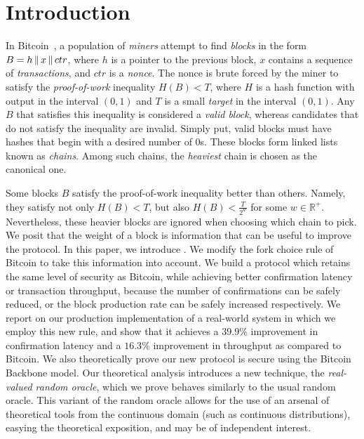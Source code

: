 \section{Introduction}

In Bitcoin~\cite{bitcoin}, a population of \emph{miners}
attempt to find \emph{blocks} in the form $B = h \,\|\, x \,\|\, ctr$,
where $h$ is a pointer to the previous block, $x$ contains a sequence of
\emph{transactions}, and $ctr$ is a \emph{nonce}. The nonce is brute forced
by the miner to satisfy the \emph{proof-of-work} inequality $H(B) < T$, where
$H$ is a hash function with output in the interval $(0, 1)$
and $T$ is a small \emph{target} in the interval $(0, 1)$. Any $B$ that satisfies this
inequality is considered a \emph{valid block}, whereas candidates that do not satisfy
the inequality are invalid. Simply put, valid blocks must have
hashes that begin with a desired number of $0$s.
These blocks form linked lists known as \emph{chains}.
Among such chains, the \emph{heaviest} chain is chosen as the canonical one.

Some blocks $B$ satisfy the proof-of-work inequality better than others.
Namely, they satisfy not only $H(B) < T$, but also $H(B) < \frac{T}{2^w}$
for some $w \in \mathbb{R}^+$. Nevertheless, these heavier blocks are ignored when choosing
which chain to pick.
We posit that the weight of a block is information
that can be useful to improve the protocol.
In this paper, we introduce \emph{\poem}.
We modify the fork choice rule of Bitcoin to take this information into account.
We build a protocol which retains the same level of security as Bitcoin, while achieving
better confirmation latency or transaction throughput, because the number of confirmations
can be safely reduced, or the block production rate can be safely increased respectively.
We report on our production implementation of a real-world system
in which we employ this new rule, and show that it achieves a $39.9\%$
improvement in confirmation latency
and a $16.3\%$ improvement in throughput as compared to Bitcoin.
We also theoretically prove our new protocol is secure
using the Bitcoin Backbone model. Our theoretical analysis introduces
a new technique, the \emph{real-valued random oracle}, which we prove behaves
similarly to the usual random oracle. This variant of the
random oracle allows for the use of an arsenal of theoretical tools from the
continuous domain (such as continuous distributions), easying the theoretical
exposition, and may be of independent interest.

